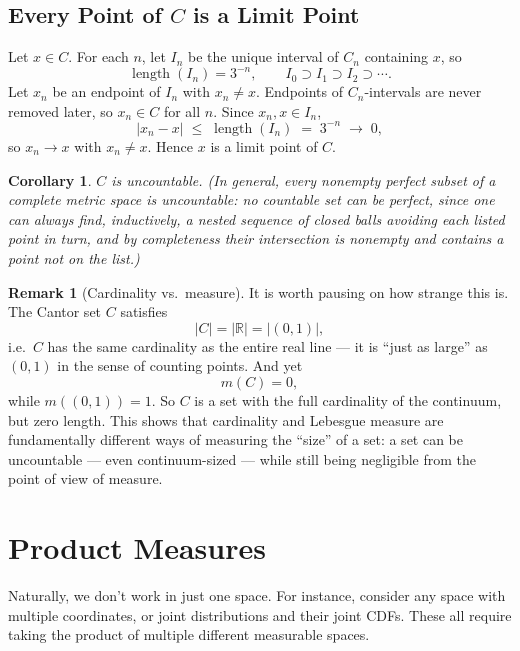 \documentclass[11pt]{article}
\theoremstyle{definition}
\newtheorem{remark}[definition]{Remark}
\theoremstyle{plain}
\newtheorem{corollary}[definition]{Corollary}
\newcommand{\R}{\mathbb{R}}
\DeclareMathOperator{\len}{length}
\begin{document}
\subsection{Every Point of \texorpdfstring{$C$}{C} is a Limit Point}

Let $x \in C$. For each $n$, let $I_n$ be the unique interval of $C_n$
containing $x$, so
\[
  \len(I_n) = 3^{-n}, \qquad I_0 \supset I_1 \supset I_2 \supset \cdots.
\]
Let $x_n$ be an endpoint of $I_n$ with $x_n \ne x$. Endpoints of
$C_n$-intervals are never removed later, so $x_n \in C$ for all $n$.
Since $x_n, x \in I_n$,
\[
  |x_n - x| \;\le\; \len(I_n) \;=\; 3^{-n} \;\to\; 0,
\]
so $x_n \to x$ with $x_n \ne x$. Hence $x$ is a limit point of $C$.

\begin{corollary}
$C$ is uncountable. (In general, every nonempty perfect subset of a
complete metric space is uncountable: no countable set can be perfect,
since one can always find, inductively, a nested sequence of closed
balls avoiding each listed point in turn, and by completeness their
intersection is nonempty and contains a point not on the list.)
\end{corollary}

\begin{remark}[Cardinality vs.\ measure]
It is worth pausing on how strange this is. The Cantor set $C$
satisfies
\[
  |C| = |\R| = |(0,1)|,
\]
i.e.\ $C$ has the same cardinality as the entire real line --- it is
``just as large'' as $(0,1)$ in the sense of counting points. And yet
\[
  m(C) = 0,
\]
while $m((0,1)) = 1$. So $C$ is a set with the full cardinality of the
continuum, but zero length. This shows that cardinality and Lebesgue
measure are fundamentally different ways of measuring the ``size'' of a
set: a set can be uncountable --- even continuum-sized --- while still
being negligible from the point of view of measure.
\end{remark}

\section{Product Measures}

Naturally, we don't work in just one space. For instance, consider any
space with multiple coordinates, or joint distributions and their joint
CDFs. These all require taking the product of multiple different
measurable spaces.
\end{document}
